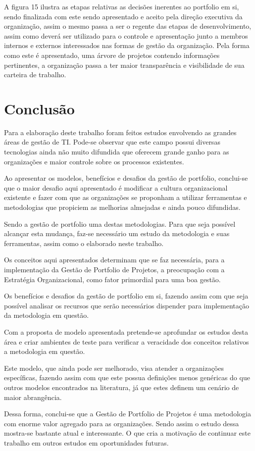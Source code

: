 \documentclass[12pt,a4paper,ruledheader,tocpage=prefix,floatnumber=continuous,pagestart=folhaderosto,font=times]{abnt}
\begin{document}
A figura 15 ilustra as etapas relativas as decisões inerentes ao portfolio em si, sendo finalizada com este sendo apresentado e aceito pela direção 
executiva da organização, assim o mesmo passa a ser o regente das etapas de desenvolvimento, assim como deverá ser utilizado para o controle e 
apresentação junto a membros internos e externos interessados nas formas de gestão da organização. Pela forma como este é apresentado, uma árvore de 
projetos contendo informações pertinentes, a organização passa a ter maior transparência e visibilidade de sua carteira de trabalho.

\chapter{Conclusão}
Para a elaboração deste trabalho foram feitos estudos envolvendo as grandes áreas de gestão de TI. Pode-se observar que este campo possui diversas tecnologias
ainda não muito difundida que oferecem grande ganho para as organizações e maior controle sobre os processos existentes.

Ao apresentar os modelos, benefícios e desafios da gestão de portfolio, conclui-se que o maior desafio aqui apresentado é modificar a cultura organizacional 
existente e fazer com  que as organizações se proponham a utilizar ferramentas e metodologias que propiciem as melhorias almejadas e ainda pouco difundidas.

Sendo a gestão de portfolio uma destas metodologias. Para que seja possível alcançar esta mudança, faz-se necessário um estudo da metodologia e suas 
ferramentas, assim como o elaborado neste trabalho.

Os conceitos aqui apresentados determinam que se faz necessária, para a implementação da Gestão de Portfolio de Projetos, a preocupação com a Estratégia 
Organizacional, como fator primordial para uma boa gestão. 

Os benefícios e desafios da gestão de portfolio em si, fazendo assim com que seja possível analisar os recursos que serão necessários dispender para 
implementação da metodologia em questão.

Com a proposta de modelo apresentada pretende-se aprofundar os estudos desta área e criar ambientes de teste para verificar a veracidade dos conceitos 
relativos a metodologia em questão. 

Este modelo, que ainda pode ser melhorado, visa atender a organizações específicas, fazendo assim com que este possua definições menos genéricas do que 
outros modelos encontrados na literatura, já que estes definem um cenário de maior abrangência.

Dessa forma, conclui-se que a Gestão de Portfolio de Projetos é uma metodologia com enorme valor agregado para as organizações. Sendo assim o estudo dessa
mostra-se bastante atual e interessante. O que cria a motivação de continuar este trabalho em outros estudos em oportunidades futuras.


 
\end{document}
